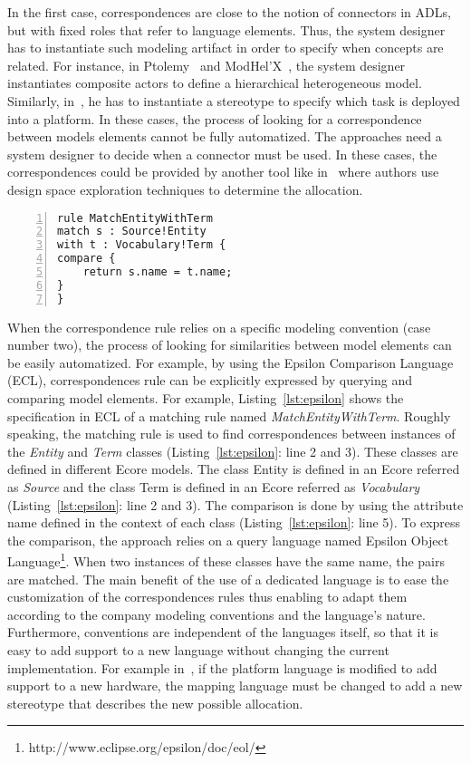 In the first case, correspondences are close to the notion of connectors in ADLs, but with fixed roles that refer to language elements. Thus, the system designer has to instantiate such modeling artifact in order to specify when concepts are related. For instance, in Ptolemy~\cite{ptoleframebib} and ModHel'X~\cite{modhelxbib}, the system designer instantiates composite actors to define a hierarchical heterogeneous model. Similarly, in~\cite{dinatale}, he has to instantiate a stereotype to specify which task is deployed into a platform. In these cases, the process of looking for a correspondence between models elements cannot be fully automatized. The approaches need a system designer to decide when a connector must be used. In these cases, the correspondences could be provided by another tool like in~\cite{kofmanbib} where authors use design space exploration techniques to determine the allocation.%
	\begin{lstlisting}[language=epsilon,
	caption={Matching rule in the Epsilon Comparison Language},
	label={lst:epsilon}, 
	basicstyle=\scriptsize\ttfamily, backgroundcolor=\color{LGrey}, numbers=left, xleftmargin=2pt]
rule MatchEntityWithTerm
match s : Source!Entity
with t : Vocabulary!Term {
compare {
	return s.name = t.name;
}
}
\end{lstlisting}
	
When the correspondence rule relies on a specific modeling convention (case number two), the process of looking for similarities between model elements can be easily automatized. For example, by using the Epsilon Comparison Language (ECL), correspondences rule can be explicitly expressed by querying and comparing model elements. For example, Listing~\ref{lst:epsilon} shows the specification in ECL of a matching rule named \emph{MatchEntityWithTerm}. Roughly speaking, the matching rule is used to find correspondences between instances of the \emph{Entity} and \emph{Term} classes (Listing~\ref{lst:epsilon}: line 2 and 3). These classes are defined in different Ecore models. The class Entity is defined in an Ecore referred as \emph{Source} and the class Term is defined in an Ecore referred as \emph{Vocabulary} (Listing~\ref{lst:epsilon}: line 2 and 3). The comparison is done by using the attribute name defined in the context of each class (Listing~\ref{lst:epsilon}: line 5). To express the comparison, the approach relies on a query language named Epsilon Object Language\footnote{http://www.eclipse.org/epsilon/doc/eol/}. When two instances of these classes have the same name, the pairs are matched. The main benefit of the use of a dedicated language is to ease the customization of the correspondences rules thus enabling to adapt them according to the company modeling conventions and the language's nature. Furthermore, conventions are independent of the languages itself, so that it is easy to add support to a new language without changing the current implementation. For example in~\cite{dinatale}, if the platform language is modified to add support to a new hardware, the mapping language must be changed to add a new stereotype that describes the new possible allocation.


